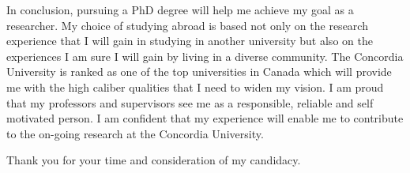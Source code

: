 \documentclass[10pt]{article}%
\begin{document}
%
  	In conclusion, pursuing a PhD degree will help me achieve my goal as a researcher. My choice of studying abroad is based not only on the research experience that I will gain in  studying in another university but also on the experiences I am sure I will gain by living in a diverse community. The Concordia University is ranked as one of the top universities in Canada which will provide me with the high caliber qualities that I need to widen my vision. I am proud that my professors and supervisors see me as a responsible, reliable and self motivated person. I am confident that my experience will enable me to contribute to the on-going research at the Concordia University.

Thank you for your time and consideration of my candidacy.
\end{document}
